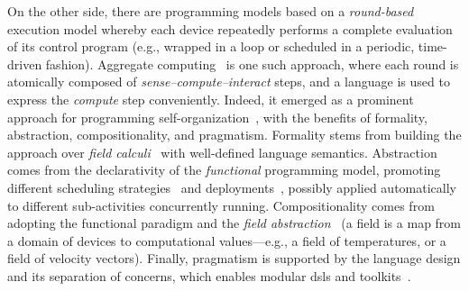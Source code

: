 On the other side, there are programming models 
 based on a \emph{round-based} execution model
 whereby 
 each device repeatedly performs a complete evaluation of its control program
 (e.g., wrapped in a loop or scheduled in a periodic, time-driven fashion).
%
Aggregate computing~\cite{bpv:aggregate:programming,vbdacp:ac:survey:jlamp}
is one such approach,
  where each round is atomically composed of \emph{sense--compute--interact} steps,
  and a language is used to express the \emph{compute} step conveniently.
%
Indeed, it emerged as 
 a prominent approach for programming
 self-organization~\cite{vbdacp:ac:survey:jlamp},
 with the benefits of formality,
 abstraction, compositionality, and pragmatism.
%
Formality stems from building the approach
 over \emph{field calculi}~\cite{vbdacp:ac:survey:jlamp} with well-defined language semantics.
%
Abstraction comes from the declarativity of the \emph{functional} programming model,
 promoting different scheduling strategies~\cite{DBLP:conf/acsos/AguzziCV22,DBLP:journals/lmcs/PianiniCVMZ21} 
 and deployments~\cite{CPPVW-FI2020}, possibly applied automatically to different sub-activities concurrently running.
%
Compositionality comes from adopting the functional paradigm and the \emph{field abstraction}~\cite{DBLP:journals/pervasive/MameiZL04,vbdacp:ac:survey:jlamp}
(a field is a map from a domain of devices to computational values---e.g., a field of temperatures, or a field of velocity vectors).
%
Finally,
pragmatism is supported by the language design and its separation of concerns,
 which enables modular \acp{dsl} and toolkits~\cite{DBLP:journals/softx/CasadeiVAP22}.

